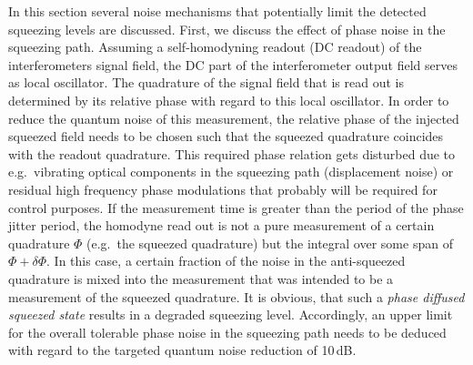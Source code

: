 In this section several noise mechanisms that potentially limit the detected squeezing levels are discussed. First, we discuss the effect of phase noise in the squeezing path. Assuming a self-homodyning
readout (DC readout) of the interferometers  signal field, the DC part of the interferometer output field serves as local oscillator. The quadrature of the signal field that is read out is determined by its relative phase with regard to this local oscillator. In order to reduce the quantum noise of this measurement, the relative phase of the injected squeezed field needs to be chosen such that the squeezed quadrature coincides with the readout quadrature. This required phase relation gets disturbed due to e.g.\ vibrating optical components in the squeezing path (displacement noise) or residual high frequency phase modulations that probably will be required for control purposes.  If the measurement time is greater than the period of the phase jitter period, the homodyne read out is not a pure measurement of a certain quadrature   $\Phi$ (e.g.\ the squeezed quadrature) but the integral over some span of $\Phi+\delta \Phi$. In this case, a certain fraction of the noise in the anti-squeezed quadrature is mixed into the measurement that was intended to be a measurement of the squeezed quadrature. It is obvious, that such a \textit{phase diffused squeezed state}  results in a degraded squeezing level.  Accordingly, an upper limit for the overall tolerable phase noise in the squeezing path needs to be deduced with regard to the targeted quantum noise reduction of 10\,dB.

